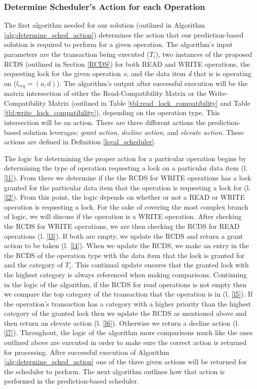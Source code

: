 \subsubsection{Determine Scheduler's Action for each Operation}
The first algorithm needed for our solution (outlined in Algorithm \ref{alg:determine_sched_action}) determines the action that our prediction-based solution is required to perform for a given operation. The algorithm's input parameters are the transaction being executed ($T_{i}$), two instances of the proposed RCDS (outlined in Section \ref{RCDS}) for both READ and WRITE operations, the requesting lock for the given operation \textit{o}, and the data item \textit{d} that is is operating on ($l_{req} = (o,d)$). The algorithm's output after successful execution will be the matrix intersection of either the Read-Compatibility Matrix or the Write-Compatibility Matrix (outlined in Table \ref{tbl:read_lock_compatibility} and Table \ref{tbl:write_lock_compatibility}), depending on the operation type. This intersection will be an action. There are three different actions the prediction-based solution leverages: \textit{grant action}, \textit{decline action}, and \textit{elevate action}. These actions are defined in Definition \ref{legal_scheduler}.

The logic for determining the proper action for a particular operation begins by determining the type of operation requesting a lock on a particular data item (l. \ref{l1}). From there we determine if the the RCDS for WRITE operations has a lock granted for the particular data item that the operation is requesting a lock for (l. \ref{l2}). From this point, the logic depends on whether or not a READ or WRITE operation is requesting a lock. For the sake of covering the most complex branch of logic, we will discuss if the operation is a WRITE operation. After checking the RCDS for WRITE operations, we are then checking the RCDS for READ operations (l. \ref{l3}). If both are empty, we update the RCDS and return a grant action to be taken (l. \ref{l4}). When we update the RCDS, we make an entry in the the RCDS of the operation type with the data item that the lock is granted for and the category of $T_{i}$. This continual update ensures that the granted lock with the highest category is always referenced when making comparisons. Continuing in the logic of the algorithm, if the RCDS for read operations is not empty then we compare the top category of the transaction that the operation is in (l. \ref{l5}). If the operation's transaction has a category with a higher priority than the highest category of the granted lock then we update the RCDS as mentioned above and then return an elevate action (l. \ref{l6}). Otherwise we return a decline action (l. \ref{l7}). Throughout, the logic of the algorithm more comparisons much like the ones outlined above are executed in order to make sure the correct action is returned for processing. After successful execution of Algorithm \ref{alg:determine_sched_action} one of the three given actions will be returned for the scheduler to perform. The next algorithm outlines how that action is performed in the prediction-based scheduler.


